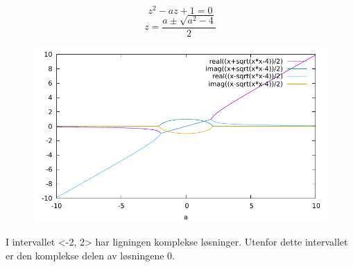 \documentclass{article}
\begin{document}
$$z^2 - az + 1 = 0$$
$$z = \frac{a \pm \sqrt{a^2 - 4}}{2}$$
\begin{figure}[H]
	\includegraphics[width=\textwidth]{output.pdf}
\end{figure}
I intervallet <-2, 2> har ligningen komplekse løsninger. Utenfor dette intervallet er den komplekse delen av løsningene 0. 
\end{document}
